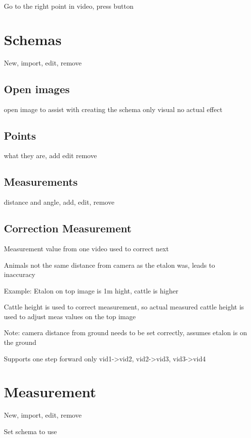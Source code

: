 \documentclass[10pt,a4paper,oneside]{report}             %
\begin{document}
Go to the right point in video, press button

\section{Schemas}

New, import, edit, remove

\subsection{Open images}

open image to assist with creating the schema
only visual no actual effect

\subsection{Points}

what they are, add edit remove

\subsection{Measurements}

distance and angle, add, edit, remove

\subsection{Correction Measurement}

Measurement value from one video used to correct next

Animals not the same distance from camera as the etalon was, leads to inaccuracy

Example: Etalon on top image is 1m hight, cattle is higher

Cattle height is used to correct measurement, so actual measured cattle height is used to adjust meas values on the top image

Note: camera distance from ground needs to be set correctly, assumes etalon is on the ground

Supports one step forward only vid1->vid2, vid2->vid3, vid3->vid4

\section{Measurement}

New, import, edit, remove

Set schema to use
\end{document}
